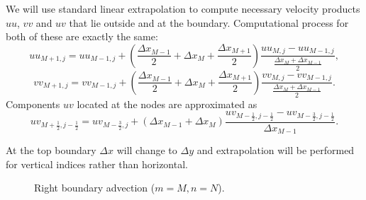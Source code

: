 \documentclass{article}
\numberwithin{equation}{section}
\begin{document}
We will use standard linear extrapolation to compute necessary velocity products $uu$, $vv$ and $uv$ that lie outside and at the boundary. Computational process for both of these are exactly the same:
\begin{equation}
	uu_{M+1,j}=uu_{M-1,j}+\left( \frac{\Delta x_{M-1}}{2}+\Delta x_M + \frac{\Delta x_{M+1}}{2} \right)\frac{uu_{M,j}-uu_{M-1,j}}{\frac{\Delta x_M+\Delta x_{M-1}}{2}},
\end{equation}
\begin{equation}
	vv_{M+1,j}=vv_{M-1,j}+\left( \frac{\Delta x_{M-1}}{2}+\Delta x_M + \frac{\Delta x_{M+1}}{2} \right)\frac{vv_{M,j}-vv_{M-1,j}}{\frac{\Delta x_M+\Delta x_{M-1}}{2}}.
\end{equation}
Components $uv$ located at the nodes are approximated as
\begin{equation}
	uv_{M+\frac{1}{2},j-\frac{1}{2}}=uv_{M-\frac{3}{2},j}+\left( {\Delta x_{M-1}}+\Delta x_M  \right)\frac{uv_{M-\frac{1}{2},j-\frac{1}{2}}-uv_{M-\frac{3}{2},j-\frac{1}{2}}}{\Delta x_{M-1}}.
\end{equation}


At the top boundary $\Delta x$ will change to $\Delta y$ and extrapolation will be performed for vertical indices rather than horizontal. 

\begin{figure}[H] %
  \caption{Right boundary advection ($m=M,n=N$).}\label{fig:ADV-right}
\end{figure}
\end{document}
